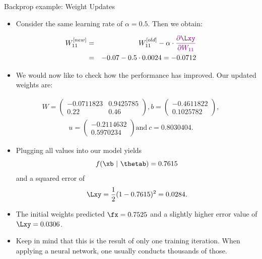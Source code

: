 \begin{vbframe}{Backprop example: Weight Updates}
\begin{itemize}
    \item Consider the same learning rate of $\alpha = 0.5$. Then we obtain:
  \end{itemize}
    \begin{eqnarray*}
      W_{11}^{[new]}  &=& W_{11}^{[old]} - \alpha \cdot  \textcolor{violet}{\frac{\partial \Lxy}{\partial W_{11}}} \\
                  &=& -0.07 - 0.5 \cdot \num[round-mode=places,round-precision=4]{0.0023645} = \num[round-mode=places,round-precision=4]{-0.0711823}
    \end{eqnarray*}
  \begin{itemize}
    \item We would now like to check how the performance has improved. Our updated weights are:
  \end{itemize}
  \begin{eqnarray*}
    W = \begin{pmatrix}
    \num[round-mode=places,round-precision=4]{-0.0711823} & \num[round-mode=places,round-precision=4]{0.9425785} \\
    0.22 & 0.46
    \end{pmatrix},
    b = \begin{pmatrix}
    \num[round-mode=places,round-precision=4]{-0.4611822} \\
    \num[round-mode=places,round-precision=4]{0.1025782}
    \end{pmatrix},
  \end{eqnarray*}
  \begin{eqnarray*}
    u = \begin{pmatrix}
    \num[round-mode=places,round-precision=4]{-0.2114632} \\
    \num[round-mode=places,round-precision=4]{0.5970234}
    \end{pmatrix}
    \text{and} \ c = \num[round-mode=places,round-precision=4]{0.8030404}\text{.}
  \end{eqnarray*}
\framebreak  

  \begin{itemize}
    \item Plugging all values into our model yields $$f(\xb ~|~\thetab) = \num[round-mode=places,round-precision=4]{0.7614865}$$ and a squared error of $$\Lxy = \frac{1}{2}(1 - \num[round-mode=places,round-precision=4]{0.7614865})^2 = \num[round-mode=places,round-precision=4]{0.02844434}.$$
    \item The initial weights predicted $\fx = \num[round-mode=places,round-precision=4]{0.7525469}$ and a slightly higher error value of $\Lxy = \num[round-mode=places,round-precision=4]{0.03061652}$.
    \lz
    \item Keep in mind that this is the result of only one training iteration. When applying a neural network, one usually conducts thousands of those.
  \end{itemize}
\end{vbframe}

